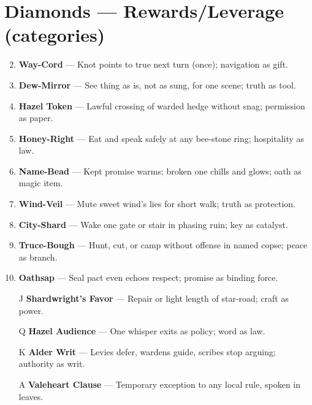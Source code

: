 \section*{Diamonds --- Rewards/Leverage (categories)}
\label{sec:valewood-rewards}
\begin{enumerate}
\setcounter{enumi}{1}
\item \textbf{Way-Cord} --- Knot points to true next turn (once); navigation as gift.
\item \textbf{Dew-Mirror} --- See thing as is, not as sung, for one scene; truth as tool.
\item \textbf{Hazel Token} --- Lawful crossing of warded hedge without snag; permission as paper.
\item \textbf{Honey-Right} --- Eat and speak safely at any bee-stone ring; hospitality as law.
\item \textbf{Name-Bead} --- Kept promise warms; broken one chills and glows; oath as magic item.
\item \textbf{Wind-Veil} --- Mute sweet wind's lies for short walk; truth as protection.
\item \textbf{City-Shard} --- Wake one gate or stair in phasing ruin; key as catalyst.
\item \textbf{Truce-Bough} --- Hunt, cut, or camp without offense in named copse; peace as branch.
\item \textbf{Oathsap} --- Seal pact even echoes respect; promise as binding force.
\item[J] \textbf{Shardwright's Favor} --- Repair or light length of star-road; craft as power.
\item[Q] \textbf{Hazel Audience} --- One whisper exits as policy; word as law.
\item[K] \textbf{Alder Writ} --- Levies defer, wardens guide, scribes stop arguing; authority as writ.
\item[A] \textbf{Valeheart Clause} --- Temporary exception to any local rule, spoken in leaves.
\end{enumerate}


